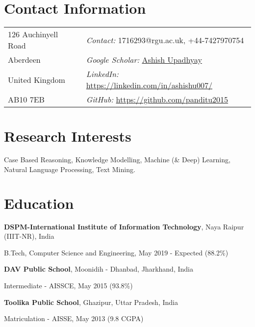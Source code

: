 \documentclass[margin,line]{res}
\newenvironment{list1}{
  \begin{list}{\ding{113}}{%
      \setlength{\itemsep}{0in}
      \setlength{\parsep}{0in} \setlength{\parskip}{0in}
      \setlength{\topsep}{0in} \setlength{\partopsep}{0in} 
      \setlength{\leftmargin}{0.17in}}}{\end{list}}
\begin{document}

\begin{resume}
\vspace{-0.1in}
\section{\sc Contact Information}
\begin{tabular}{@{}p{2in}p{3in}}          
126 Auchinyell Road   & {\it Contact:} 1716293@rgu.ac.uk, +44-7427970754 \\         
Aberdeen & {\it Google Scholar:} {\href{https://scholar.google.co.in/citations?view_op=list_works&hl=en&user=aUwP8DAAAAAJ}{Ashish Upadhyay}}\\       
United Kingdom & {\it LinkedIn:} {\href{https://www.linkedin.com/in/ashishu007/}{https://linkedin.com/in/ashishu007/}} \\     
AB10 7EB  & {\it GitHub: }\href{https://github.com/panditu2015}{https://github.com/panditu2015} \\     
\end{tabular}

\vspace{-0.1in}
\section{\sc Research Interests}
Case Based Reasoning, Knowledge Modelling, Machine (\& Deep) Learning, Natural Language Processing, Text Mining.

\vspace{-0.1in}
\section{\sc Education}
{\bf DSPM-International Institute of Information Technology}, Naya Raipur (IIIT-NR), India
\begin{list1}
\item[] B.Tech, Computer Science and Engineering, May 2019 - Expected (88.2\%)
\end{list1}
\vspace{-0.1in}
{\bf DAV Public School}, Moonidih - Dhanbad, Jharkhand, India\\
\vspace*{-.5cm}
\begin{list1}
\item[] Intermediate - AISSCE, May 2015 (93.8\%)
\end{list1}
\vspace{-0.1in}
{\bf Toolika Public School}, Ghazipur, Uttar Pradesh, India\\
\vspace*{-.5cm}
\begin{list1}
\item[] Matriculation - AISSE, May 2013 (9.8 CGPA)
\end{list1}


\end{resume}
\end{document}
